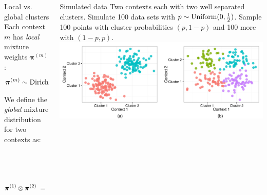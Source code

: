 \documentclass[t, final]{beamer}
\begin{document}
\begin{frame}{}
\begin{columns}[t]
\begin{column}{.32\linewidth}

\begin{block}{Local vs. global clusters}
  Each context $m$ has \emph{local} mixture weights $\bm{\pi}^{(m)}$:
  \begin{align*}
    \small
    \bm{\pi}^{(m)} &\sim \text{Dirichlet}\left(\frac{\alpha_m}{K^{(m)}}, \dots, \frac{\alpha_m}{K^{(m)}} \right)
  \end{align*}
  We define the \emph{global} mixture distribution for two contexts as:
  \begin{align*}
    \small
    \bm{\rho} &\sim \text{Dirichlet}\left(\gamma \;
      \text{vec}\left(\bm{\pi}^{(1)} \otimes \bm{\pi}^{(2)}\right)\right) \\
    \begin{split}
      \small
      \bm{\pi}^{(1)} \otimes \bm{\pi}^{(2)} \; &= \;
      \begin{pmatrix}
        \pi^{(1)}_1 \pi_1^{(2)} & \pi^{(1)}_1 \pi_2^{(2)} & \cdots &
        \pi^{(1)}_1 \pi^{(2)}_K \\[0.5em]
        \pi^{(1)}_2 \pi_1^{(2)} & \pi^{(1)}_2 \pi_2^{(2)} & \cdots &
        \pi^{(1)}_2 \pi^{(2)}_K \\[0.5em]
        \vdots  & \vdots  & \ddots & \vdots  \\[0.5em]
        \pi^{(1)}_K \pi^{(2)}_1 & \pi^{(1)}_K \pi^{(2)}_2 & \cdots &
        \pi^{(1)}_K \pi^{(2)}_K
      \end{pmatrix}
      \end{split}
  \end{align*}
  {\small {}}
\end{block}

\end{column}


\begin{column}{.32\linewidth}

\begin{block}{Simulated data}
  Two contexts each with two well separated clusters. Simulate 100 data sets
  with $p \sim \textnormal{Uniform}(0, \frac{1}{2})$.
  Sample 100 points with cluster probabilities $(p, 1-p)$ and 100 more with $(1-p, p)$.
  \includegraphics[width=\textwidth]{Figures/simulated-data}
\end{block}


\end{column}
\end{columns}
\end{frame}
\end{document}
